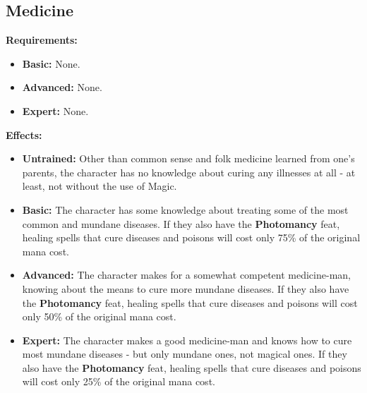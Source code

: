 \subsection{Medicine}
\textbf{Requirements:}
\begin{itemize}
	\item \textbf{Basic:} None.
	\item \textbf{Advanced:} None.
	\item \textbf{Expert:} None.
\end{itemize}
\textbf{Effects:}
\begin{itemize}
	\item \textbf{Untrained:} Other than common sense  and folk medicine learned from one's parents, the character has no knowledge about curing any illnesses at all - at least, not without the use of Magic.
	\item \textbf{Basic:} The character has some knowledge about treating some of the most common and mundane diseases. If they also have the \textbf{Photomancy} feat, healing spells that cure diseases and poisons will cost only 75\% of the original mana cost.
	\item \textbf{Advanced:} The character makes for a somewhat competent medicine-man, knowing about the means to cure more mundane diseases. If they also have the \textbf{Photomancy} feat, healing spells that cure diseases and poisons will cost only 50\% of the original mana cost.
	\item \textbf{Expert:} The character makes a good medicine-man and knows how to cure most mundane diseases - but only mundane ones, not magical ones. If they also have the \textbf{Photomancy} feat, healing spells that cure diseases and poisons will cost only 25\% of the original mana cost.
\end{itemize}\newpage
